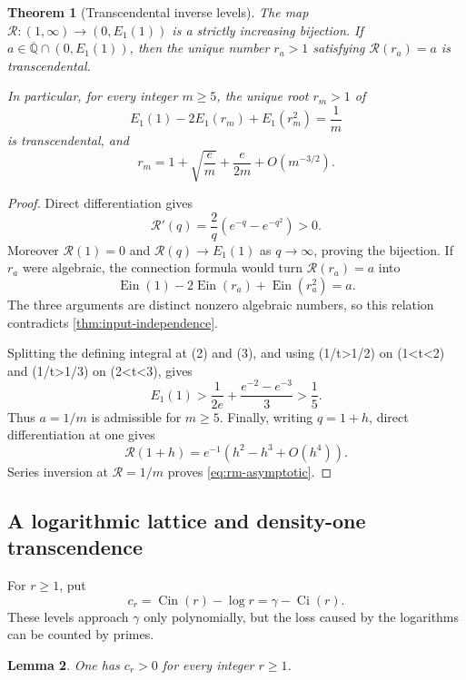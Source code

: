 \documentclass[11pt]{article}
\theoremstyle{keio}
\newtheorem{theorem}{Theorem}[section]
\newtheorem{lemma}[theorem]{Lemma}
\theoremstyle{definition}
\theoremstyle{remark}
\newcommand{\Qbar}{\overline{\mathbb Q}}
\newcommand{\Ein}{\operatorname{Ein}}
\newcommand{\Cin}{\operatorname{Cin}}
\newcommand{\Ci}{\operatorname{Ci}}
\begin{document}
\begin{theorem}[Transcendental inverse levels]
\label{thm:inverse-levels}
The map \(\mathscr R:(1,\infty)\to(0,E_1(1))\) is a strictly increasing
bijection.  If \(a\in\Qbar\cap(0,E_1(1))\), then the unique number
\(r_a>1\) satisfying \(\mathscr R(r_a)=a\) is transcendental.

In particular, for every integer \(m\ge5\), the unique root \(r_m>1\) of
\begin{equation}\label{eq:rm-level}
 E_1(1)-2E_1(r_m)+E_1(r_m^2)=\frac1m
\end{equation}
is transcendental, and
\begin{equation}\label{eq:rm-asymptotic}
 r_m=1+\sqrt{\frac em}+\frac e{2m}+O(m^{-3/2}).
\end{equation}
\end{theorem}

\begin{proof}
Direct differentiation gives
\[
 \mathscr R'(q)=\frac2q(e^{-q}-e^{-q^2})>0.
\]
Moreover \(\mathscr R(1)=0\) and
\(\mathscr R(q)\to E_1(1)\) as \(q\to\infty\), proving the bijection.
If \(r_a\) were algebraic, the connection formula would turn
\(\mathscr R(r_a)=a\) into
\[
 \Ein(1)-2\Ein(r_a)+\Ein(r_a^2)=a.
\]
The three arguments are distinct nonzero algebraic numbers, so this relation
contradicts \cref{thm:input-independence}.

Splitting the defining integral at (2) and (3), and using
(1/t>1/2) on (1<t<2) and (1/t>1/3) on (2<t<3), gives
\[
 E_1(1)>\frac1{2e}+\frac{e^{-2}-e^{-3}}3>\frac15.
\]
Thus \(a=1/m\) is admissible for \(m\ge5\).  Finally, writing \(q=1+h\),
direct differentiation at one gives
\[
 \mathscr R(1+h)=e^{-1}(h^2-h^3+O(h^4)).
\]
Series inversion at \(\mathscr R=1/m\) proves
\eqref{eq:rm-asymptotic}.
\end{proof}

\subsection{A logarithmic lattice and density-one transcendence}

For \(r\ge1\), put
\begin{equation}\label{eq:cr}
 c_r=\Cin(r)-\log r=\gamma-\Ci(r).
\end{equation}
These levels approach \(\gamma\) only polynomially, but the loss caused by
the logarithms can be counted by primes.

\begin{lemma}\label{lem:cr-positive}
One has \(c_r>0\) for every integer \(r\ge1\).
\end{lemma}
\end{document}
